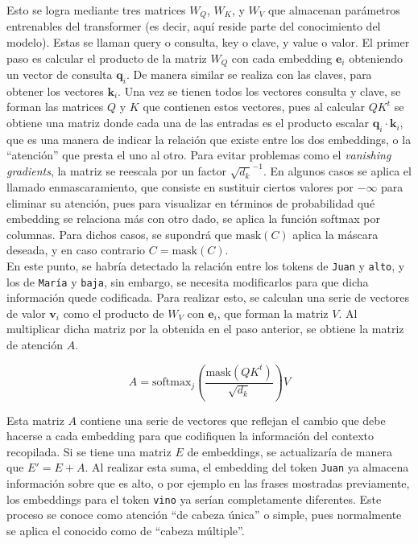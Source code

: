 				Esto se logra mediante tres matrices $W_Q$, $W_K$, y $W_V$ que almacenan parámetros entrenables del transformer (es decir, aquí reside parte del conocimiento del modelo). Estas se llaman query o consulta, key o clave, y value o valor. El primer paso es calcular el producto de la matriz $W_Q$ con cada embedding $\textbf{e}_i$ obteniendo un vector de consulta $\textbf{q}_i$. De manera similar se realiza con las claves, para obtener los vectores $\textbf{k}_i$. Una vez se tienen todos los vectores consulta y clave, se forman las matrices $Q$ y $K$ que contienen estos vectores, pues al calcular $QK^t$ se obtiene una matriz donde cada una de las entradas es el producto escalar $\textbf{q}_i \cdot \textbf{k}_i$, que es una manera de indicar la relación que existe entre los dos embeddings, o la ``atención'' que presta el uno al otro. Para evitar problemas como el \textit{vanishing gradients}, la matriz se reescala por un factor $\sqrt{d_k}^{-1}$. En algunos casos se aplica el llamado enmascaramiento, que consiste en sustituir ciertos valores por $-\infty$ para eliminar su atención, pues para visualizar en términos de probabilidad qué embedding se relaciona más con otro dado, se aplica la función softmax por columnas. Para dichos casos, se supondrá que $\text{mask}(C)$ aplica la máscara deseada, y en caso contrario $C = \text{mask}(C)$. \\
				
				En este punto, se habría detectado la relación entre los tokens de \texttt{Juan} y \texttt{alto}, y los de \texttt{María} y \texttt{baja}, sin embargo, se necesita modificarlos para que dicha información quede codificada. Para realizar esto, se calculan una serie de vectores de valor $\textbf{v}_i$ como el producto de $W_V$ con $\textbf{e}_i$, que forman la matriz $V$. Al multiplicar dicha matriz por la obtenida en el paso anterior, se obtiene la matriz de atención $A$. 
				
				$$
				A = \text{softmax}_j\left(\frac{\text{mask}\left(QK^t\right)}{\sqrt{d_k}}\right)V
				$$
				
				Esta matriz $A$ contiene una serie de vectores que reflejan el cambio que debe hacerse a cada embedding para que codifiquen la información del contexto recopilada. Si se tiene una matriz $E$ de embeddings, se actualizaría de manera que $E' = E + A$. Al realizar esta suma, el embedding del token \texttt{Juan} ya almacena información sobre que es alto, o por ejemplo en las frases mostradas previamente, los embeddings para el token \texttt{vino} ya serían completamente diferentes. Este proceso se conoce como atención ``de cabeza única'' o simple, pues normalmente se aplica el conocido como de ``cabeza múltiple''. \\
				
